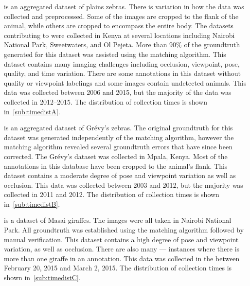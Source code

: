         \begin{itemln}
            \item \textbf{\pzmasterI{}} is an aggregated dataset of plains zebras.
            There is variation in how the data was collected and preprocessed.
            Some of the images are cropped to the flank of the animal, while others are cropped to encompass the
              entire body.
            The datasets contributing to \pzmasterI{} were collected in Kenya at several locations including
              Nairobi National Park, Sweetwaters, and Ol Pejeta.
            More than $90\percent$ of the groundtruth generated for this dataset was assisted using the matching
              algorithm.
            This dataset contains many imaging challenges including occlusion, viewpoint, pose, quality, and time
              variation.
            There are some annotations in this dataset without quality or viewpoint labelings and some images
              contain undetected animals.
            This data was collected between 2006 and 2015, but the majority of the data was collected in
              2012--2015.
            The distribution of collection times is shown in~\cref{sub:timedistA}.

            \item \textbf{\gzall{}} is an aggregated dataset of Grévy's zebras.
            The original groundtruth for this dataset was generated independently of the matching algorithm,
              however the matching algorithm revealed several groundtruth errors that have since been corrected.
            The Grévy's dataset was collected in Mpala, Kenya.
            Most of the annotations in this database have been cropped to the animal's flank.
            This dataset contains a moderate degree of pose and viewpoint variation as well as occlusion.
            This data was collected between 2003 and 2012, but the majority was collected in 2011 and 2012.
            The distribution of collection times is shown in~\cref{sub:timedistB}.

            \item \textbf{\girmmasterI{}} is a dataset of Masai giraffes.
            The images were all taken in Nairobi National Park.
            All groundtruth was established using the matching algorithm followed by manual verification.
            This dataset contains a high degree of pose and viewpoint variation, as well as occlusion.
            There are also many  --- instances where there is more than one giraffe in an
              annotation.
            This data was collected in the \GZC{} between February 20, 2015 and March 2, 2015.
            The distribution of collection times is shown in~\cref{sub:timedistC}.
        \end{itemln}

